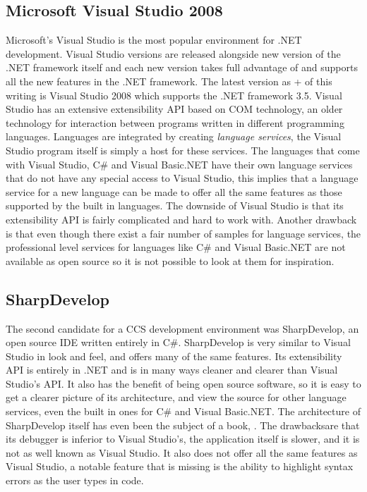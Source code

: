 	\subsection{Microsoft Visual Studio 2008}
	Microsoft's Visual Studio is the most popular environment for .NET 
	development. Visual Studio versions are released alongside new version of 
	the .NET framework itself and each new version takes full advantage of and 
	supports all the new features in the .NET framework. The latest version as +
	of this writing is Visual Studio 2008 which supports the .NET framework 3.5. 
	Visual Studio has an extensive extensibility API based on COM technology, an 
	older technology for interaction between programs written in different 
	programming languages. Languages are integrated by creating \textit{language 
	services}, the Visual Studio program itself is simply a host for these 
	services. The languages that come with Visual Studio, C\# and Visual 
	Basic.NET have their own language services that do not have any special 
	access to Visual Studio, this implies that a language service for a new 
	language can be made to offer all the same features as those supported by 
	the built in languages. The downside of Visual Studio is that its 
	extensibility API is fairly complicated and hard to work with. Another 
	drawback is that even though there exist a fair number of samples for 
	language services, the professional level services for languages like C\# 
	and Visual Basic.NET are not available as open source so it is not possible 
	to look at them for inspiration.
	
	\subsection{SharpDevelop}
	The second candidate for a CCS development environment was SharpDevelop, an 
	open source IDE written entirely in C\#. SharpDevelop is very similar to 
	Visual Studio in look and feel, and offers many of the same features. Its 
	extensibility API is entirely in .NET and is in many ways cleaner and 
	clearer than Visual Studio's API. It also has the benefit of being open 
	source software, so it is easy to get a clearer picture of its architecture, 
	and view the source for other language services, even the built in ones for 
	C\# and Visual Basic.NET. The architecture of SharpDevelop itself has even 
	been the subject of a book, \cite{sharpdevelop}. The drawbacksare that its 
	debugger is inferior to Visual Studio's, the application itself is slower, 
	and it is not as well known as Visual Studio. It also does not offer all the 
	same features as Visual Studio, a notable feature that is missing is the 
	ability to highlight syntax errors as the user types in code.
	
